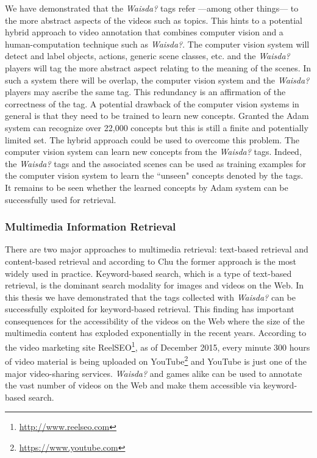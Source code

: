 We have demonstrated that the \textit{Waisda?} tags refer ---among other things--- to the more abstract aspects of the videos such as topics.
This hints to a potential hybrid approach to video annotation that combines computer vision and a human-computation technique such as \textit{Waisda?}. The computer vision system will detect and label objects, actions, generic scene classes, etc. and the \textit{Waisda?} players will tag the more abstract aspect relating to the meaning of the scenes. In such a system there will be overlap, the computer vision system and the \textit{Waisda?} players may ascribe the same tag. This redundancy is an affirmation of the correctness of the tag. A potential drawback of the computer vision systems in general is that they need to be trained to learn new concepts. Granted the Adam system can recognize over 22,000 concepts but this is still a finite and potentially limited set. The hybrid approach could be used to overcome this problem. The computer vision system can learn new concepts from the \textit{Waisda?} tags. Indeed, the \textit{Waisda?} tags and the associated scenes can be used as training examples for the computer vision system to learn the ``unseen" concepts denoted by the tags. It remains to be seen whether the learned concepts by Adam system can be successfully used for retrieval.

\subsubsection{Multimedia Information Retrieval}
There are two major approaches to multimedia retrieval: text-based retrieval and content-based retrieval and according to Chu \cite{journals/jasis/Chu01} the former approach is the most widely used in practice. Keyword-based search, which is a type of text-based retrieval, is the dominant search modality for images and videos on the Web. In this thesis we have demonstrated that the tags collected with \textit{Waisda?} can be successfully exploited for keyword-based retrieval. This finding has important consequences for the accessibility of the videos on the Web where the size of the multimedia content has exploded exponentially in the recent years. According to the video marketing site ReelSEO\footnote{\url{http://www.reelseo.com}}, as of December 2015, every minute 300 hours of video material is being uploaded on YouTube\footnote{\url{https://www.youtube.com}}\cite{reelseo} and YouTube is just one of the major video-sharing services. \textit{Waisda?} and games alike can be used to annotate the vast number of videos on the Web and make them accessible via keyword-based search.

